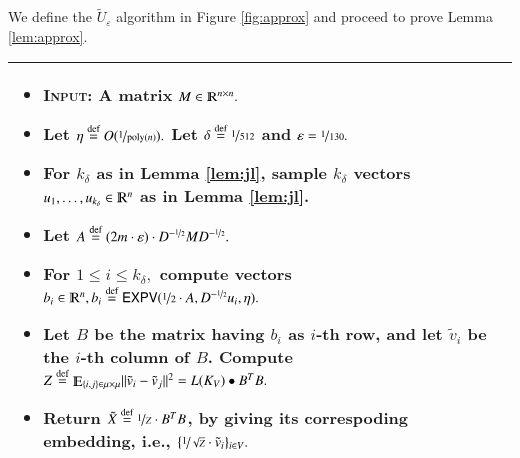 \documentclass[twoside,leqno,twocolumn]{article}
\newcommand{\nfrac}{\nicefrac}
\renewcommand{\mathbb}{\varmathbb}
\renewcommand{\leq}{\leqslant}
\newcommand{\norm}[1]{\lVert#1\rVert}
\newcommand{\poly}{\mathrm{poly}}
\newcommand{\defeq}{\stackrel{\textup{def}}{=}}
\newcommand{\R}{\mathbb R}
\newcommand{\Esymb}{\mathbb{E}}
\DeclareMathOperator*{\E}{\Esymb}
\newcommand{\e}{\epsilon}
\let\e\varepsilon
\newcommand{\Degin}{D^{-\nfrac{1}{2}}}
\numberwithin{equation}{section}
\begin{document}
We define the $\tilde{U}_\e$ algorithm in Figure \ref{fig:approx} and proceed to prove Lemma \ref{lem:approx}.
\begin{figure*}[h]
  \begin{tabularx}{\textwidth}{|X|}
    \hline
  \begin{itemize}
\item {\bf \textsc{Input:}} A matrix $M \in \R^{n \times n}.$
\item Let $\eta \defeq O(\nfrac{1}{\poly(n)}).$ Let $\delta \defeq \nfrac{1}{512}$ and $\e=\nfrac{1}{130}.$
\item For $k_\delta$ as in Lemma \ref{lem:jl}, sample $k_\delta$ vectors $u_1, \ldots, u_{k_\delta} \in \R^n$ as in Lemma \ref{lem:jl}.
\item Let $A \defeq (2m \cdot \e) \cdot \Degin M \Degin.$
\item For $1 \leq i \leq k_\delta,$ compute vectors $b_i \in \R^n, b_i \defeq {\sf EXPV}(\nfrac{1}{2} \cdot A, \Degin u_i, \eta).$

 \item Let $B$ be the matrix having $b_i$ as $i$-th row,  and let $\tilde{v}_i$ be the $i$-th column of $B$. Compute $Z \defeq \E_{\{i,j\} \in \mu \times \mu} \norm{\tilde{v}_i -\tilde{v}_j}^2 = L(K_V) \bullet B^T B.$
\item  Return $\tilde{X} \defeq \nfrac{1}{Z} \cdot B^T B$, by giving its correspoding embedding, i.e., $\{\nfrac{1}{\sqrt{Z}} \cdot \tilde{v}_i\}_{i \in V}.$ 

  
  \end{itemize}\\
   \hline
    \end{tabularx}

  \caption{The $\tilde{E}_\e$ algorithm}
  \label{fig:approx}
\end{figure*}
\end{document}
